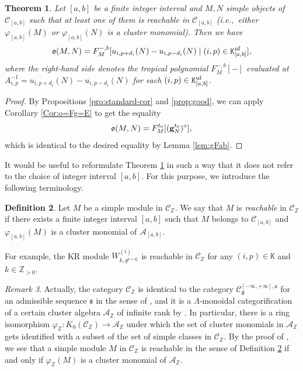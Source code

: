 \documentclass[12pt]{amsart}
\newtheorem{theorem}{Theorem}[section]
\theoremstyle{definition}
\newtheorem{definition}[theorem]{Definition}
\theoremstyle{remark}
\newtheorem{remark}[theorem]{Remark}
\numberwithin{equation}{section}
\newcommand{\ie}{\textit{i.e.,}\ }
\begin{document}
\begin{theorem}\label{thm:oF}
Let $[a,b]$ be a finite integer interval and $M,N$ simple objects of $\mathcal{C}_{[a,b]}$ such that at least one of them is reachable in $\mathcal{C}_{[a,b]}$ (\ie either $\varphi_{[a,b]}(M)$ or $\varphi_{[a,b]}(N)$ is a cluster monomial). 
Then we have
\[ \mathfrak{o}(M,N) = F^{-, b}_{M}[u_{i,p+d_i}(N)-u_{i,p-d_i}(N) \mid (i,p) \in \mathtt{K}_{[a,b]}^{\rm uf}],\]
where the right-hand side denotes the tropical polynomial $F_M^{-, b}[-]$ evaluated at $A_{i,p}^{-1} = u_{i,p+d_i}(N)- u_{i,p-d_i}(N)$ for each $(i,p) \in \mathtt{K}_{[a,b]}^{\rm uf}$.
\end{theorem}
\begin{proof}
By Propositions \ref{pro:standard-cor} and \ref{prop:good}, we can apply Corollary \ref{Cor:o=Fg=E} to get the equality
\[ \mathfrak{o}(M,N) = F_{M}^{t_0}[({\bf g}_N^{t_0})^\circ],\]
which is identical to the desired equality by Lemma \ref{lem:gFab}.
\end{proof}



It would be useful to reformulate Theorem \ref{thm:oF} in such a way that it does not refer to the choice of integer interval $[a,b]$.
For this purpose, we introduce the following terminology.

\begin{definition} \label{def:reachableCZ}
Let $M$ be a simple module in $\mathcal{C}_{\mathbb Z}$.
We say that $M$ is \emph{reachable} in $\mathcal{C}_{\mathbb Z}$ if there exists a finite integer interval $[a,b]$
such that $M$ belongs to  $\mathcal{C}_{[a,b]}$ and $\varphi_{[a,b]}(M)$ is a cluster monomial of $\mathcal A_{[a,b]}$.
\end{definition}

For example, the KR module $W^{(i)}_{k,q^{p+d_i}}$ is reachable in $\mathcal{C}_{\mathbb Z}$ for any $(i,p) \in \mathtt{K}$ and $k \in \mathbb{Z}_{>0}$. 

\begin{remark} \label{rem:reachableCZ}
Actually, the category $\mathcal{C}_\mathbb{Z}$ is identical to the category $\mathcal{C}^{[-\infty,+\infty], \mathfrak{s}}_{\mathfrak{g}}$ for an admissible sequence $\mathfrak{s}$ in the sense of \cite{kkop-2024}, and it is a $\mathsf{\Lambda}$-monoidal categorification of a certain cluster algebra $\mathcal{A}_{\mathbb{Z}}$ of infinite rank by \cite[Theorem 8.1]{kkop-2024}.
In particular, there is a ring isomorphism $\varphi_\mathbb{Z} \colon K_0(\mathcal{C}_{\mathbb Z}) \to \mathcal{A}_{\mathbb Z}$ under which the set of cluster monomials in $\mathcal{A}_{\mathbb Z}$ gets identified with a subset of the set of simple classes in $\mathcal{C}_{\mathbb Z}$. By the proof of \cite[Theorem 8.1]{kkop-2024},  we see that a simple module $M$ in $\mathcal{C}_\mathbb{Z}$ is reachable in the sense of Definition \ref{def:reachableCZ} if and only if $\varphi_{\mathbb Z}(M)$ is a cluster monomial of $\mathcal{A}_{\mathbb Z}$.
\end{remark}
\end{document}
